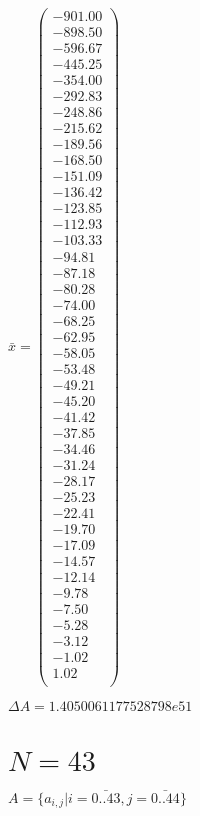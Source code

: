 \documentclass[a4paper,12pt]{article}
\begin{document}
$\bar { x } = \begin{pmatrix}
-901.00 \\
-898.50 \\
-596.67 \\
-445.25 \\
-354.00 \\
-292.83 \\
-248.86 \\
-215.62 \\
-189.56 \\
-168.50 \\
-151.09 \\
-136.42 \\
-123.85 \\
-112.93 \\
-103.33 \\
-94.81 \\
-87.18 \\
-80.28 \\
-74.00 \\
-68.25 \\
-62.95 \\
-58.05 \\
-53.48 \\
-49.21 \\
-45.20 \\
-41.42 \\
-37.85 \\
-34.46 \\
-31.24 \\
-28.17 \\
-25.23 \\
-22.41 \\
-19.70 \\
-17.09 \\
-14.57 \\
-12.14 \\
-9.78 \\
-7.50 \\
-5.28 \\
-3.12 \\
-1.02 \\
1.02 \\
\end{pmatrix}
$

$\Delta A = 1.4050061177528798e51$



\section{ $N = 43$ }
$A = \{ a _{ i, j } | i = \bar { 0..43 }, j = \bar { 0..44 } \}$
\end{document}
